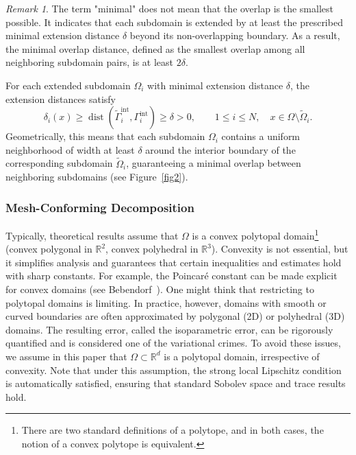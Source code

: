 \documentclass[a4paper, 11pt]{article}
\theoremstyle{remark}
\newtheorem{remark}[equation]{Remark}
\begin{document}
\begin{remark}
The term "minimal" does not mean that the overlap is the smallest possible. It indicates that each subdomain is extended by at least the prescribed minimal 
extension distance $\delta$ beyond its non-overlapping boundary. As a result, the minimal overlap distance, defined as the smallest overlap among all neighboring 
subdomain pairs, is at least $2\delta$. 

\vspace{6pt}
\noindent For each extended subdomain $\Omega_i$ with minimal extension distance $\delta$, the extension distances satisfy
\begin{equation*}
    \delta_i(x) \ge \operatorname{dist}(\widetilde{\Gamma}_i^{\text{int}}, \Gamma_i^{\text{int}}) \geq \delta>0, 
    \qquad 1 \leq i \leq N, \quad x \in \Omega \setminus \widetilde{\Omega}_i.
\end{equation*}
Geometrically, this means that each subdomain $\Omega_i$ contains a uniform neighborhood of width at least $\delta$ around the interior boundary of the 
corresponding subdomain $\widetilde{\Omega}_i$, guaranteeing a minimal overlap between neighboring subdomains (see Figure~\ref{fig2}).
\end{remark}

\subsubsection{Mesh-Conforming Decomposition}

Typically, theoretical results assume that $\Omega$ is a convex polytopal domain\footnote{There are two standard definitions of a polytope, and in both cases, the notion of a convex polytope is equivalent.} (convex polygonal in $\mathbb{R}^{2}$, convex polyhedral in $\mathbb{R}^{3}$). Convexity is not essential, but it simplifies analysis and guarantees that certain inequalities and estimates hold with sharp constants. For example, the Poincaré constant can be made explicit for convex domains (see Bebendorf~\cite{Bebendorf2003Poincare}). One might think that restricting to polytopal domains is limiting. In practice, however, domains with smooth or curved boundaries are often approximated by polygonal (2D) or polyhedral (3D) domains. The resulting error, called the isoparametric error, can be rigorously quantified and is considered one of the variational crimes. To avoid these issues, we assume in this paper that $\Omega \subset \mathbb{R}^{d}$ is a polytopal domain, irrespective of convexity. Note that under this assumption, the strong local Lipschitz condition is automatically satisfied, ensuring that standard Sobolev space and trace results hold.
\end{document}
